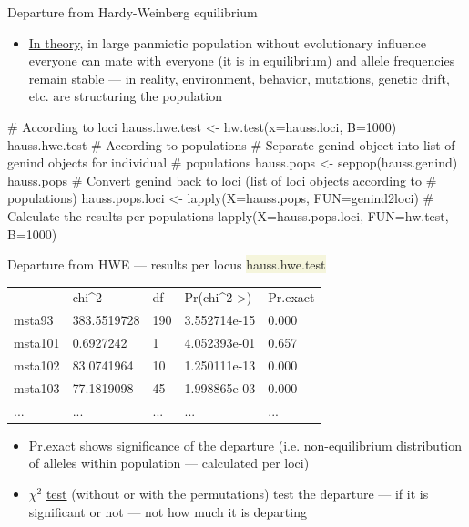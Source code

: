 \documentclass[compress, ucs, xelatex, 11pt, xcolor=svgnames, aspectratio=169,
	hyperref={
		bookmarks=true,
		unicode=true,
		colorlinks=true,
		pdftitle={Molecular data in R},
		plainpages=false,
		pdfauthor={Vojtech Zeisek},
		pdfsubject={Course about phylogeny and evolution in R},
		pdfcreator={XeLaTeX},
		pdfkeywords={R, evolution, phylogeny, molecular data},
		linkcolor=Crimson, %
		anchorcolor=Magenta, %
		citecolor=Magenta, %
		filecolor=Magenta, %
		menucolor=Magenta, %
		urlcolor=DodgerBlue, %
		pdftex},
	url={hyphens, lowtilde} %
	]{beamer}
\renewcommand{\texttt}[1]{\colorbox{Beige}{{\ttfamily #1}}}
\begin{document}
\begin{frame}[fragile]{Departure from Hardy-Weinberg equilibrium}
	\begin{itemize}
		\item \href{https://en.wikipedia.org/wiki/Hardy%E2%80%93Weinberg_principle}{In theory}, in large panmictic population without evolutionary influence everyone can mate with everyone (it is in equilibrium) and allele frequencies remain stable --- in reality, environment, behavior, mutations, genetic drift, etc. are structuring the population
	\end{itemize}
	\begin{spluscode}
    # According to loci
    hauss.hwe.test <- hw.test(x=hauss.loci, B=1000)
    hauss.hwe.test
    # According to populations
    # Separate genind object into list of genind objects for individual
    # populations
    hauss.pops <- seppop(hauss.genind)
    hauss.pops
    # Convert genind back to loci (list of loci objects according to
    # populations)
    hauss.pops.loci <- lapply(X=hauss.pops, FUN=genind2loci)
    # Calculate the results per populations
    lapply(X=hauss.pops.loci, FUN=hw.test, B=1000)
	\end{spluscode}
\end{frame}

\begin{frame}[fragile]{Departure from HWE --- results per locus}
	\vfill
	\texttt{hauss.hwe.test}
	\begin{tabular}{lllll}
		& chi\textasciicircum2 & df & Pr(chi\textasciicircum2 >) & Pr.exact\\
		msta93 & 383.5519728 & 190 & 3.552714e-15 & 0.000\\
		msta101 & 0.6927242 & 1 & 4.052393e-01 & 0.657\\
		msta102 & 83.0741964 & 10 & 1.250111e-13 & 0.000\\
		msta103 & 77.1819098 & 45 & 1.998865e-03 & 0.000\\
		... & ... & ... & ... & ...
	\end{tabular}
	\vfill
	\begin{itemize}
		\item Pr.exact shows significance of the departure (i.e. non-equilibrium distribution of alleles within population --- calculated per loci)
		\item $\chi^2$ \href{https://en.wikipedia.org/wiki/Pearson%27s_chi-squared_test}{test} (without or with the permutations) test the departure --- if it is significant or not --- not how much it is departing
	\end{itemize}
	\vfill
\end{frame}
\end{document}
